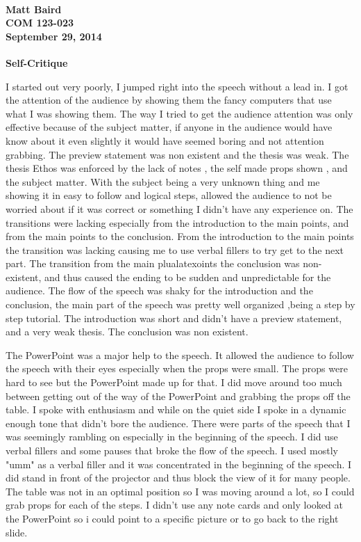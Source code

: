 \documentclass[12pt,letterpaper]{article}
\author{Matthew Baird}
\begin{document}
\paragraph{Matt Baird \\ COM 123-023 \\ September 29, 2014 }
\begin{center}
\textbf{Self-Critique}
\end{center}
\par{ I started out very poorly, I jumped right into the speech without a lead in. I got the attention of the audience by showing them the fancy computers that use what I was showing them. The way I tried to get the audience attention was only effective because of the subject matter, if anyone in the audience would have know about it even slightly it would have seemed boring and not attention grabbing. The preview statement was non existent and the thesis was weak. The thesis Ethos was enforced by the lack of notes , the self made props shown , and the subject matter. With the subject being a very unknown thing and me showing it in easy to follow and logical steps, allowed the audience to not be worried about if it was correct or something I didn't have any experience on. The transitions were lacking especially from the introduction to the main points, and from the main points to the conclusion. From the introduction to the main points the transition was lacking causing me to use verbal fillers to try get to the next part. The transition from the main plualatexoints the  conclusion was non-existent, and thus caused the ending to be sudden and unpredictable for the audience. The flow of the speech was shaky for the introduction and the conclusion, the main part of the speech was pretty well organized ,being a step by step tutorial. The introduction was short and didn't have a preview statement, and a very weak thesis. The conclusion was non existent.  }

\par{ The PowerPoint was a major help to the speech. It allowed the audience to follow the speech with their eyes especially when the props were small. The props were hard to see but the PowerPoint made up for that. I did move around too much between getting out of the way of the PowerPoint and grabbing the props off the table.  I spoke with enthusiasm and while on the quiet side I spoke in a dynamic enough tone that didn't bore the audience. There were parts of the speech that I was seemingly rambling on especially in the beginning of the speech.  I did use verbal fillers and some pauses that broke the flow of the speech. I used mostly  "umm" as a verbal filler and it was concentrated in the beginning  of the speech. I did stand in front of the projector and thus block the view of it for many people. The table was not in an optimal position so I was moving around a lot, so I could grab props for each of the steps. I didn't use any note cards and only looked at the PowerPoint so i could point to a specific picture or to go back to the right slide. }
\end{document}
